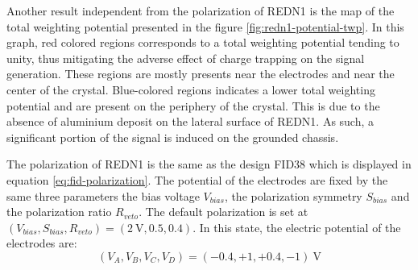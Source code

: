 Another result independent from the polarization of REDN1 is the map of the total weighting potential presented in the figure \ref{fig:redn1-potential-twp}.
In this graph, red colored regions corresponds to a total weighting potential tending to unity, thus mitigating the adverse effect of charge trapping on the signal generation. These regions are mostly presents near the electrodes and near the center of the crystal. 
Blue-colored regions indicates a lower total weighting potential and are present on the periphery of the crystal. This is due to the absence of aluminium deposit on the lateral surface of REDN1. As such, a significant portion of the signal is induced on the grounded chassis.

The polarization of REDN1 is the same as the design FID38 which is displayed in equation \ref{eq:fid-polarization}. The potential of the electrodes are fixed by the same three parameters the bias voltage $V_{bias}$, the polarization symmetry $S_{bias}$ and the polarization ratio $R_{veto}$.
The default polarization is set at $\left( V_{bias}, S_{bias}, R_{veto} \right) = (\SI{2}{\volt}, 0.5, 0.4)$. In this state, the electric potential of the electrodes are:
\begin{equation}
(V_A, V_B, V_C, V_D) = (-0.4, +1, +0.4, -1)\ \si{\volt}
\end{equation}


